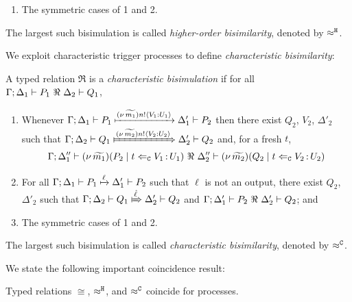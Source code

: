 \documentclass[runningheads]{llncs}
\begin{document}
{{\begin{definition}
\begin{enumerate}[1)]
		\item	The symmetric cases of 1 and 2.                
	\end{enumerate}
%
	The largest such bisimulation is called \emph{higher-order bisimilarity}, denoted by $\approx^\mathtt{H}$.
\end{definition}


We exploit characteristic trigger processes to define \emph{characteristic bisimilarity}: 

\begin{definition}
\label{d:fwb}
	A typed relation $\Re$ is a {\em  characteristic bisimulation} if 
	for all $\horel{\Gamma}{\Delta_1}{P_1}{\ \Re \ }{\Delta_2}{Q_1}$, 
%
	\begin{enumerate}[1)]
		\item 
				Whenever 
				$\Gamma; \Delta_1 \vdash P_1 \xmapsto{(\nu\, \widetilde{m_1}) n !\langle V_1: U_1 \rangle} \Delta_1' \vdash P_2$ 
				then there exist 
				$Q_2$, $V_2$, $\Delta'_2$ such that 
				$\horel{\Gamma}{\Delta_2}{Q_1}{\Hby{\news{\widetilde{m_2}}\bactout{n}{V_2: U_2}}}{\Delta_2'}{Q_2}$
				and, for a fresh $t$,
%
				\[
					\Gamma; \Delta''_1  \proves  {\newsp{\widetilde{m_1}}{P_2 \Par \ftrigger{t}{V_1}{U_1}}}
	 				\ \Re\ 
					\Delta''_2 \proves {\newsp{\widetilde{m_2}}{Q_2 \Par \ftrigger{t}{V_2}{U_2}}}
				\]

		\item	
				For all $\Gamma; \Delta_1 \vdash P_1 \xmapsto{\ell} \Delta_1' \vdash P_2$ such that 
				$\ell$ is not an output, there exist $Q_2$, $\Delta'_2$ such that 
				$\horel{\Gamma}{\Delta_2}{Q_1}{\Hby{\hat{\ell}}}{\Delta_2'}{Q_2}$
				and
				$\horel{\Gamma}{\Delta_1'}{P_2}{\ \Re \ }{\Delta_2'}{Q_2}$; and 

		\item	The symmetric cases of 1 and 2.                
	\end{enumerate}
%
	The largest such bisimulation is called \emph{characteristic bisimilarity}, denoted by $\approx^\mathtt{C}$.
\end{definition}




We state the following important coincidence result: %
\begin{theorem}[\cite{KouzapasPY17}]\label{t:coincide}
	Typed relations $\cong$, $\approx^\mathtt{H}$, and $\approx^\mathtt{C}$ coincide for \HOp processes.
\end{theorem}


}}
\end{document}
